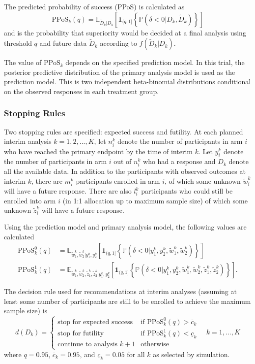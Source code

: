 \documentclass{bmcart}
\begin{document}
The predicted probability of success (PPoS) \cite{berry2010bayesian} is calculated as
$$
\text{PPoS}_k(q) = \mathbb E_{\tilde D_k | D_k}\left[\textbf{1}_{(q,1]}\left\{\mathbb P(\delta<0|D_k,\tilde D_k)\right\}\right]
$$
and is the probability that superiority would be decided at a final analysis using threshold $q$ and future data $\tilde D_k$ according to $f(\tilde D_k|D_k)$.

The value of \(\text{PPoS}_k\) depends on the specified prediction model.
In this trial, the posterior predictive distribution of the primary analysis model is used as the prediction model.
This is two independent beta-binomial distributions conditional on the observed responses in each treatment group.

\subsubsection*{Stopping Rules}

Two stopping rules are specified: expected success and futility.
At each planned interim analysis $k=1,2,...,K$, let $n_i^k$ denote the number of participants in arm $i$ who have reached the primary endpoint by the time of interim $k$.
Let $y_i^k$ denote the number of participants in arm $i$ out of $n_i^k$ who had a response and $D_k$ denote all the available data.
In addition to the participants with observed outcomes at interim $k$, there are $m_i^k$ participants enrolled in arm $i$, of which some unknown $\tilde w_i^k$ will have a future response. There are also $l_i^k$ participants who could still be enrolled into arm $i$ (in 1:1 allocation up to maximum sample size) of which some unknown $\tilde z_i^k$ will have a future response.

Using the prediction model and primary analysis model, the following values are calculated
$$
\begin{aligned}
\text{PPoS}_k^0(q) &= \mathbb E_{\tilde w_1^k,\tilde w_2^k|y_1^k,y_2^k}\left[\textbf{1}_{(q,1]}\left\{\mathbb P\left(\delta<0|y_1^k,y_2^k,\tilde w_1^k,\tilde w_2^k\right)\right\}\right] \\
\text{PPoS}_k^1(q) &= \mathbb E_{\tilde w_1^k,\tilde w_2^k,\tilde z_1^k,\tilde z_2^k|y_1^k,y_2^k}\left[\textbf{1}_{(q,1]}\left\{\mathbb P\left(\delta<0|y_1^k,y_2^k,\tilde w_1^k,\tilde w_2^k,\tilde z_1^k,\tilde z_2^k\right)\right\}\right].
\end{aligned}
$$

The decision rule used for recommendations at interim analyses (assuming at least some number of participants are still to be enrolled to achieve the maximum sample size) is
$$
d(D_k)=\begin{cases}
\text{stop for expected success} & \text{if } \text{PPoS}_k^0(q) > \overline{c}_k \\
\text{stop for futility} & \text{if } \text{PPoS}_k^1(q) < \underline{c}_k \\
\text{continue to analysis }k+1 &\text{otherwise}
\end{cases} \quad k=1,...,K
$$
where $q=0.95$, $\overline{c}_k=0.95$, and $\underline{c}_k=0.05$ for all $k$ as selected by simulation.
\end{document}

